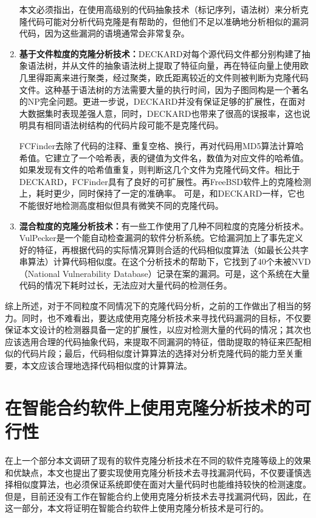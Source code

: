 \begin{enumerate}
      本文必须指出，在使用高级别的代码抽象技术（标记序列，语法树）来分析克隆代码可能对分析代码克隆是有帮助的，但他们不足以准确地分析相似的漏洞代码，因为这些漏洞的语境通常会非常复杂。
  \item \textbf{基于文件粒度的克隆分析技术：}DECKARD\cite{deckard}对每个源代码文件都分别构建了抽象语法树，并从文件的抽象语法树上提取了特征向量，再在特征向量上使用欧几里得距离来进行聚类，经过聚类，欧氏距离较近的文件则被判断为克隆代码文件。这种基于语法树的方法需要大量的执行时间，因为子图同构是一个著名的NP完全问题。更进一步说，DECKARD并没有保证足够的扩展性，在面对大数据集时表现差强人意，同时，DECKARD也带来了很高的误报率，这也说明具有相同语法树结构的代码片段可能不是克隆代码。

      FCFinder\cite{fcfinder}去除了代码的注释、重复空格、换行，再对代码用MD5算法计算哈希值。它建立了一个哈希表，表的键值为文件名，数值为对应文件的哈希值。如果发现有文件的哈希值重复，则判断这几个文件为克隆代码文件。相比于DECKARD，FCFinder具有了良好的可扩展性。再FreeBSD软件上的克隆检测上，耗时更少，同时保持了一定的准确率。 可是，和DECKARD一样，它也不能很好地检测高度相似但具有微笑不同的克隆代码。
  \item \textbf{混合粒度的克隆分析技术：}有一些工作使用了几种不同粒度的克隆分析技术。VulPecker\cite{vulpecker}是一个能自动检查漏洞的软件分析系统。它给漏洞加上了事先定义好的特征，再根据代码的实际情况算则合适的代码相似度算法（如最长公共字串算法）计算代码相似度。在这个分析技术的帮助下，它找到了40个未被NVD（National Vulnerability Database）记录在案的漏洞。可是，这个系统在大量代码的情况下耗时过长，无法应对大量代码的检测任务。
\end{enumerate}

综上所述，对于不同粒度不同情况下的克隆代码分析，之前的工作做出了相当的努力。同时，也不难看出，要达成使用克隆分析技术来寻找代码漏洞的目标，不仅要保证本文设计的检测器具备一定的扩展性，以应对检测大量的代码的情况；其次也应该选用合理的代码抽象代码，来提取不同漏洞的特征，借助提取的特征来匹配相似的代码片段；最后，代码相似度计算算法的选择对分析克隆代码的能力至关重要，本文应该合理地选择代码相似度的计算算法。

\section{在智能合约软件上使用克隆分析技术的可行性}

在上一个部分本文调研了现有的软件克隆分析技术在不同的软件克隆等级上的效果和优缺点，本文也提出了要实现使用克隆分析技术去寻找漏洞代码，不仅要谨慎选择相似度算法，也必须保证系统即使在面对大量代码时也能维持较快的检测速度。但是，目前还没有工作在智能合约上使用克隆分析技术去寻找漏洞代码，因此，在这一部分，本文将证明在智能合约软件上使用克隆分析技术是可行的。

